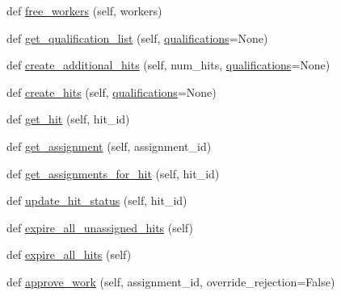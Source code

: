 \begin{DoxyCompactItemize}
def \hyperlink{classparlai_1_1mturk_1_1core_1_1dev_1_1mturk__manager_1_1MTurkManager_a8a37e17e8eaa5574052296aea72115d1}{free\+\_\+workers} (self, workers)
\item 
def \hyperlink{classparlai_1_1mturk_1_1core_1_1dev_1_1mturk__manager_1_1MTurkManager_a1bd71362181f7e85c7556ff195457a23}{get\+\_\+qualification\+\_\+list} (self, \hyperlink{classparlai_1_1mturk_1_1core_1_1dev_1_1mturk__manager_1_1MTurkManager_a7dfb4d5fcc9f2c9b3638bedaa095916c}{qualifications}=None)
\item 
def \hyperlink{classparlai_1_1mturk_1_1core_1_1dev_1_1mturk__manager_1_1MTurkManager_ab6e93169cded3f12f6d5f509de7dc64b}{create\+\_\+additional\+\_\+hits} (self, num\+\_\+hits, \hyperlink{classparlai_1_1mturk_1_1core_1_1dev_1_1mturk__manager_1_1MTurkManager_a7dfb4d5fcc9f2c9b3638bedaa095916c}{qualifications}=None)
\item 
def \hyperlink{classparlai_1_1mturk_1_1core_1_1dev_1_1mturk__manager_1_1MTurkManager_ac5d939202bcf4714b4f6f38b2e9650c0}{create\+\_\+hits} (self, \hyperlink{classparlai_1_1mturk_1_1core_1_1dev_1_1mturk__manager_1_1MTurkManager_a7dfb4d5fcc9f2c9b3638bedaa095916c}{qualifications}=None)
\item 
def \hyperlink{classparlai_1_1mturk_1_1core_1_1dev_1_1mturk__manager_1_1MTurkManager_a34c0e6ddbe21c6d21e73eeadc90c3d64}{get\+\_\+hit} (self, hit\+\_\+id)
\item 
def \hyperlink{classparlai_1_1mturk_1_1core_1_1dev_1_1mturk__manager_1_1MTurkManager_a286a186310495e0bde1ac63843c7c44e}{get\+\_\+assignment} (self, assignment\+\_\+id)
\item 
def \hyperlink{classparlai_1_1mturk_1_1core_1_1dev_1_1mturk__manager_1_1MTurkManager_a305def6340d70d27d773d3a44067365b}{get\+\_\+assignments\+\_\+for\+\_\+hit} (self, hit\+\_\+id)
\item 
def \hyperlink{classparlai_1_1mturk_1_1core_1_1dev_1_1mturk__manager_1_1MTurkManager_a1dcb973dba5c4261e8f9d7ba004ae2f2}{update\+\_\+hit\+\_\+status} (self, hit\+\_\+id)
\item 
def \hyperlink{classparlai_1_1mturk_1_1core_1_1dev_1_1mturk__manager_1_1MTurkManager_a03219ffafb8bdb12abc9237c1b58c62b}{expire\+\_\+all\+\_\+unassigned\+\_\+hits} (self)
\item 
def \hyperlink{classparlai_1_1mturk_1_1core_1_1dev_1_1mturk__manager_1_1MTurkManager_adfea3bed271a071333c873d3f7c8fb8b}{expire\+\_\+all\+\_\+hits} (self)
\item 
def \hyperlink{classparlai_1_1mturk_1_1core_1_1dev_1_1mturk__manager_1_1MTurkManager_a404ea4258642de992e96a9696519b662}{approve\+\_\+work} (self, assignment\+\_\+id, override\+\_\+rejection=False)

\end{DoxyCompactItemize}
